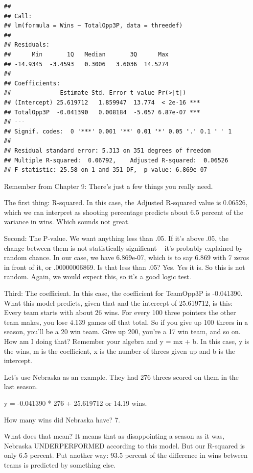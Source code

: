 \documentclass[
]{book}
\begin{document}
\begin{verbatim}
## 
## Call:
## lm(formula = Wins ~ TotalOpp3P, data = threedef)
## 
## Residuals:
##      Min       1Q   Median       3Q      Max 
## -14.9345  -3.4593   0.3006   3.6036  14.5274 
## 
## Coefficients:
##              Estimate Std. Error t value Pr(>|t|)    
## (Intercept) 25.619712   1.859947  13.774  < 2e-16 ***
## TotalOpp3P  -0.041390   0.008184  -5.057 6.87e-07 ***
## ---
## Signif. codes:  0 '***' 0.001 '**' 0.01 '*' 0.05 '.' 0.1 ' ' 1
## 
## Residual standard error: 5.313 on 351 degrees of freedom
## Multiple R-squared:  0.06792,	Adjusted R-squared:  0.06526 
## F-statistic: 25.58 on 1 and 351 DF,  p-value: 6.869e-07
\end{verbatim}

Remember from Chapter 9: There's just a few things you really need.

The first thing: R-squared. In this case, the Adjusted R-squared value is 0.06526, which we can interpret as shooting percentage predicts about 6.5 percent of the variance in wins. Which sounds not great.

Second: The P-value. We want anything less than .05. If it's above .05, the change between them is not statistically significant -- it's probably explained by random chance. In our case, we have 6.869e-07, which is to say 6.869 with 7 zeros in front of it, or .00000006869. Is that less than .05? Yes. Yes it is. So this is not random. Again, we would expect this, so it's a good logic test.

Third: The coefficient. In this case, the coefficient for TeamOpp3P is -0.041390. What this model predicts, given that and the intercept of 25.619712, is this: Every team starts with about 26 wins. For every 100 three pointers the other team makes, you lose 4.139 games off that total. So if you give up 100 threes in a season, you'll be a 20 win team. Give up 200, you're a 17 win team, and so on. How am I doing that? Remember your algebra and y = mx + b. In this case, y is the wins, m is the coefficient, x is the number of threes given up and b is the intercept.

Let's use Nebraska as an example. They had 276 threes scored on them in the last season.

y = -0.041390 * 276 + 25.619712 or 14.19 wins.

How many wins did Nebraska have? 7.

What does that mean? It means that as disappointing a season as it was, Nebraska UNDERPERFORMED according to this model. But our R-squared is only 6.5 percent. Put another way: 93.5 percent of the difference in wins between teams is predicted by something else.
\end{document}
